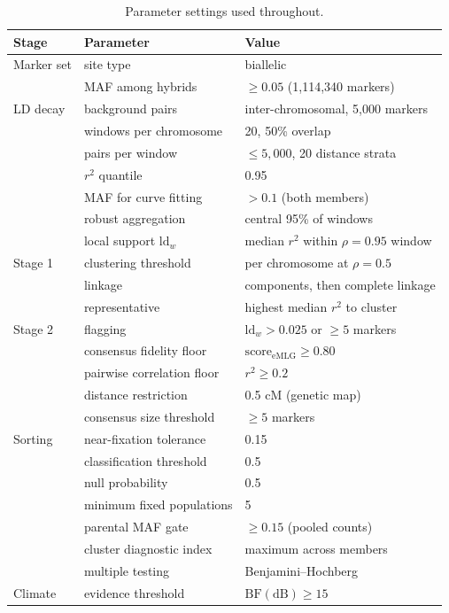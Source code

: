 \documentclass[11pt]{article}
\newcommand{\rsq}{\ensuremath{r^{2}}}
\begin{document}
\begin{table}[h]
\centering
\caption{Parameter settings used throughout.}
\label{tab:params}
\small
\begin{tabular}{lll}
\toprule
Stage & Parameter & Value \\
\midrule
Marker set & site type & biallelic \\
 & MAF among hybrids & $\ge 0.05$ (1{,}114{,}340 markers) \\
\midrule
LD decay & background pairs & inter-chromosomal, 5{,}000 markers \\
 & windows per chromosome & 20, 50\% overlap \\
 & pairs per window & $\le 5{,}000$, 20 distance strata \\
 & \rsq{} quantile & 0.95 \\
 & MAF for curve fitting & $> 0.1$ (both members) \\
 & robust aggregation & central 95\% of windows \\
 & local support $\mathrm{ld}_w$ & median \rsq{} within $\rho = 0.95$ window \\
\midrule
Stage 1 & clustering threshold & per chromosome at $\rho = 0.5$ \\
 & linkage & components, then complete linkage \\
 & representative & highest median \rsq{} to cluster \\
\midrule
Stage 2 & flagging & $\mathrm{ld}_w > 0.025$ or $\ge 5$ markers \\
 & consensus fidelity floor & $\mathrm{score}_{\mathrm{eMLG}} \ge 0.80$ \\
 & pairwise correlation floor & $\rsq \ge 0.2$ \\
 & distance restriction & 0.5 cM (genetic map) \\
 & consensus size threshold & $\ge 5$ markers \\
\midrule
Sorting & near-fixation tolerance & 0.15 \\
 & classification threshold & 0.5 \\
 & null probability & 0.5 \\
 & minimum fixed populations & 5 \\
 & parental MAF gate & $\ge 0.15$ (pooled counts) \\
 & cluster diagnostic index & maximum across members \\
 & multiple testing & Benjamini--Hochberg \\
\midrule
Climate & evidence threshold & $\mathrm{BF(dB)} \ge 15$ \\

\end{tabular}
\end{table}
\end{document}
